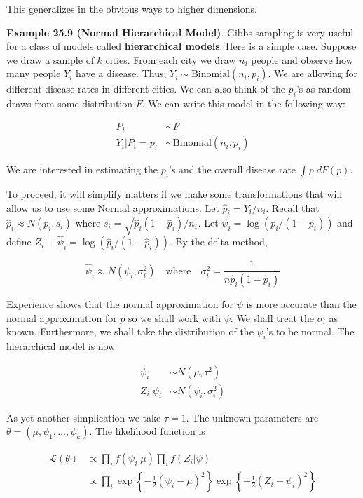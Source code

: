 This generalizes in the obvious ways to higher dimensions.

\textbf{Example 25.9 (Normal Hierarchical Model)}. Gibbs sampling is
very useful for a class of models called \textbf{hierarchical models}.
Here is a simple case. Suppose we draw a sample of \(k\) cities. From
each city we draw \(n_i\) people and observe how many people \(Y_i\)
have a disease. Thus, \(Y_i \sim \text{Binomial}(n_i, p_i)\). We are
allowing for different disease rates in different cities. We can also
think of the \(p_i\)'s as random draws from some distribution \(F\). We
can write this model in the following way:

\[
\begin{align}
P_i &\sim F \\
Y_i | P_i = p_i &\sim \text{Binomial}(n_i, p_i)
\end{align}
\]

We are interested in estimating the \(p_i\)'s and the overall disease
rate \(\int p \; dF(p)\).

To proceed, it will simplify matters if we make some transformations
that will allow us to use some Normal approximations. Let
\(\hat{p}_i = Y_i / n_i\). Recall that \(\hat{p}_i \approx N(p_i, s_i)\)
where \(s_i = \sqrt{\hat{p}_i (1 - \hat{p}_i) / n_i}\). Let
\(\psi_i = \log (p_i / (1 - p_i))\) and define
\(Z_i \equiv \hat{\psi}_i = \log (\hat{p}_i / (1 - \hat{p}_i))\). By the
delta method,

\[ \hat{\psi}_i \approx N(\psi_i, \sigma_i^2) \quad \text{where} \quad \sigma_i^2 = \frac{1}{n \hat{p}_i (1 - \hat{p}_i)}\]

Experience shows that the normal approximation for \(\psi\) is more
accurate than the normal approximation for \(p\) so we shall work with
\(\psi\). We shall treat the \(\sigma_i\) as known. Furthermore, we
shall take the distribution of the \(\psi_i\)'s to be normal. The
hierarchical model is now

\[
\begin{align}
\psi_i &\sim N(\mu, \tau^2) \\
Z_i | \psi_i &\sim N(\psi_i, \sigma_i^2)
\end{align}
\]

As yet another simplication we take \(\tau = 1\). The unknown parameters
are \(\theta = (\mu, \psi_1, \dots, \psi_k)\). The likelihood function
is

\[ 
\begin{align}
\mathcal{L}(\theta) 
&\propto \prod_i f(\psi_i | \mu) \prod_i f(Z_i | \psi) \\
&\propto \prod _i \exp \left\{-\frac{1}{2} (\psi_i - \mu)^2 \right\} \exp \left\{ -\frac{1}{2} (Z_i - \psi_i)^2 \right\}
\end{align}
\]


